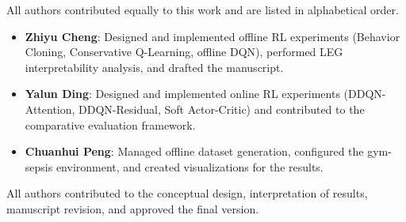 
All authors contributed equally to this work and are listed in alphabetical order.

\begin{itemize}
    \item \textbf{Zhiyu Cheng}: Designed and implemented offline RL experiments (Behavior Cloning, Conservative Q-Learning, offline DQN), performed LEG interpretability analysis, and drafted the manuscript.

    \item \textbf{Yalun Ding}: Designed and implemented online RL experiments (DDQN-Attention, DDQN-Residual, Soft Actor-Critic) and contributed to the comparative evaluation framework.

    \item \textbf{Chuanhui Peng}: Managed offline dataset generation, configured the gym-sepsis environment, and created visualizations for the results.
\end{itemize}

All authors contributed to the conceptual design, interpretation of results, manuscript revision, and approved the final version.
